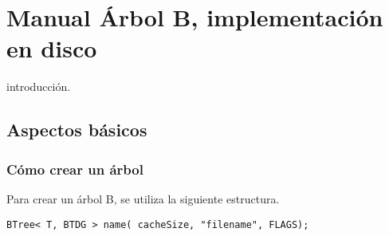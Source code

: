 \documentclass{book}
\begin{document}
\chapter{Manual Árbol B, implementación en disco}
\label{chap:api}
introducción.

\section{Aspectos básicos}

\subsection{Cómo crear un árbol}

Para crear un árbol B, se utiliza  la siguiente estructura.\\

\begin{verbatim}
BTree< T, BTDG > name( cacheSize, "filename", FLAGS);
\end{verbatim}
\end{document}
